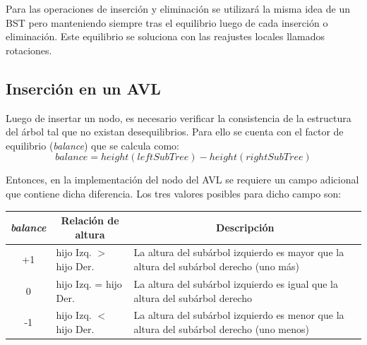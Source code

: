 Para las operaciones de inserción y eliminación se utilizará la misma idea de un BST pero manteniendo siempre tras el equilibrio luego de cada inserción o eliminación. Este equilibrio se soluciona con las reajustes locales llamados rotaciones.

\subsection{Inserción en un AVL}

Luego de insertar un nodo, es necesario verificar la consistencia de la estructura del árbol tal que no existan desequilibrios. Para ello se cuenta con el factor de equilibrio (\textit{balance}) que se calcula como:
$$balance = height(leftSubTree) - height(rightSubTree)$$

Entonces, en la implementación del nodo del AVL se requiere un campo adicional que contiene dicha diferencia. Los tres valores posibles para dicho campo son:
\begin{table}[h]
\begin{tabular}{cll}
\hline
\textit{balance} & \multicolumn{1}{c}{Relación de altura} & \multicolumn{1}{c}{Descripción}                                                          \\ \hline
+1      & hijo Izq. $>$ hijo Der.       & La altura del subárbol izquierdo es mayor que la altura del subárbol derecho (uno más) \\
0       & hijo Izq. = hijo Der.                  & La altura del subárbol izquierdo es igual que la altura del subárbol derecho             \\
-1      & hijo Izq. $<$ hijo Der.          & La altura del subárbol izquierdo es menor que la altura del subárbol derecho (uno menos)
\end{tabular}
\end{table}

